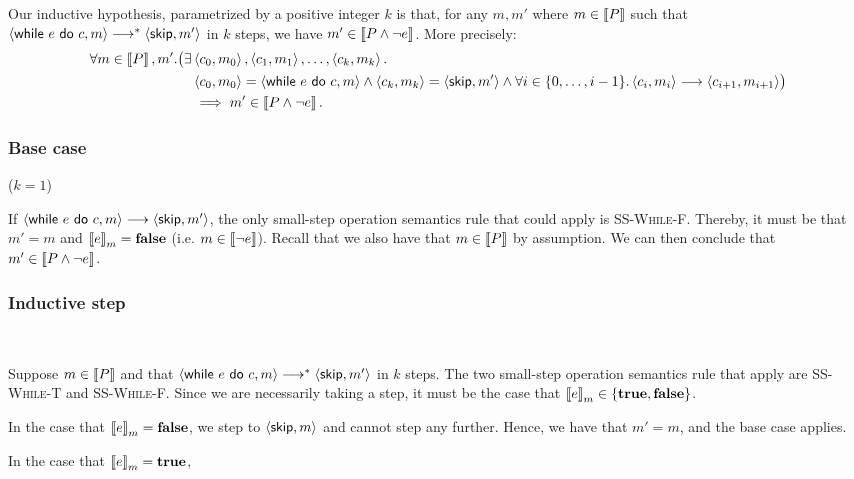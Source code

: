 \documentclass[10pt]{article}
\theoremstyle{definition}
\begin{document}
Our inductive hypothesis, parametrized by a positive integer $k$ is that, 
for any $m, m'$ where $m \in \left\llbracket P \right\rrbracket$ such that 
$\Cfg(\While e do c, m) \sstepstotrans \Cfg(\Skip, m')$ in $k$ steps, 
we have $m' \in \left\llbracket P \wedge \neg e \right\rrbracket$.
More precisely:
\begin{align*}
    \forall m \in \Interp{P}, m'. 
    \bigl(\exists &\Cfg(c_0, m_0), \Cfg(c_1, m_1), \ldots, \Cfg(c_k, m_k). \\
     &\Cfg(c_0, m_0) = \Cfg(\While e do c, m)
     \wedge \Cfg(c_k, m_k) = \Cfg(\Skip, m') 
     \wedge \forall i \in \{0, \ldots, i-1\}. \Cfg(c_i, m_i) \sstepsto \Cfg(c_{i+1}, m_{i+1}) 
     \bigr) \\
    &\implies m' \in \Interp{P \wedge \neg e}.
\end{align*}

\subsubsection*{Base case} ($k = 1$)

\noindent
If $\Cfg(\While e do c, m) \sstepsto \Cfg(\Skip, m')$, the only small-step operation semantics rule 
that could apply is \textsc{SS-While-F}.
Thereby, it must be that $m' = m$ and $\Eval(e, m) = \False$ (i.e. $m \in \left\llbracket \neg e \right\rrbracket$).
Recall that we also have that $m \in \left\llbracket P \right\rrbracket$ by assumption.
We can then conclude that $m' \in \left\llbracket P \wedge \neg e \right\rrbracket$.

\subsubsection*{Inductive step}\

\noindent
Suppose $m \in \left\llbracket P \right\rrbracket$ and that $\Cfg(\While e do c, m) \sstepstotrans \Cfg(\Skip, m')$ in $k$ steps.
The two small-step operation semantics rule that apply are \textsc{SS-While-T} and \textsc{SS-While-F}.
Since we are necessarily taking a step, it must be the case that $\Eval(e, m) \in \{\True, \False\}$.

In the case that $\Eval(e, m) = \False$, we step to $\Cfg(\Skip, m)$ and cannot step any further.
Hence, we have that $m' = m$, and the base case applies.

In the case that $\Eval(e, m) = \True$, 


\end{document}
